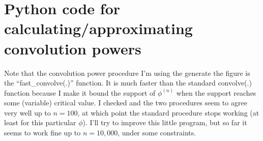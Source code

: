 \documentclass{article}
\theoremstyle{definition}
\begin{document}
\newpage

\section*{Python code for calculating/approximating convolution powers}

Note that the convolution power procedure I'm using the generate the figure is the ``fast\_convolve(.)'' function. It is much faster than the standard convolve(.) function because I make it bound the support of $\phi^{(n)}$ when the support reaches some (variable) critical value. I checked and the two procedures seem to agree very well up to $n=100$, at which point the standard procedure stops working (at least for this particular $\phi$). I'll try to improve this little program, but so far it seems to work fine up to $n=10,000$, under some constraints. \\
\end{document}
